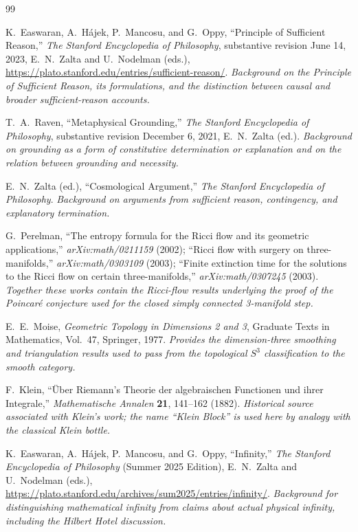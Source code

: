 \documentclass[11pt]{article}
\theoremstyle{canonstyle}
\newcommand{\CanonBibliographySetup}{%
  \small
  \setlength{\parskip}{0.22em}
  \setlength{\itemsep}{0.55em}
}
\begin{document}
\begin{thebibliography}{99}
\CanonBibliographySetup

K.~Easwaran, A.~H\'ajek, P.~Mancosu, and G.~Oppy, ``Principle of Sufficient Reason,'' \textit{The Stanford Encyclopedia of Philosophy}, substantive revision June 14, 2023, E.~N.~Zalta and U.~Nodelman (eds.), \url{https://plato.stanford.edu/entries/sufficient-reason/}.
\textit{Background on the Principle of Sufficient Reason, its formulations, and the distinction between causal and broader sufficient-reason accounts.}

T.~A.~Raven, ``Metaphysical Grounding,'' \textit{The Stanford Encyclopedia of Philosophy}, substantive revision December 6, 2021, E.~N.~Zalta (ed.).
\textit{Background on grounding as a form of constitutive determination or explanation and on the relation between grounding and necessity.}

E.~N.~Zalta (ed.), ``Cosmological Argument,'' \textit{The Stanford Encyclopedia of Philosophy}.
\textit{Background on arguments from sufficient reason, contingency, and explanatory termination.}

G.~Perelman, ``The entropy formula for the Ricci flow and its geometric applications,'' \textit{arXiv:math/0211159} (2002); ``Ricci flow with surgery on three-manifolds,'' \textit{arXiv:math/0303109} (2003); ``Finite extinction time for the solutions to the Ricci flow on certain three-manifolds,'' \textit{arXiv:math/0307245} (2003).
\textit{Together these works contain the Ricci-flow results underlying the proof of the Poincar\'e conjecture used for the closed simply connected 3-manifold step.}

E.~E.~Moise, \textit{Geometric Topology in Dimensions 2 and 3}, Graduate Texts in Mathematics, Vol.~47, Springer, 1977.
\textit{Provides the dimension-three smoothing and triangulation results used to pass from the topological $S^3$ classification to the smooth category.}

F.~Klein, ``\"Uber Riemann's Theorie der algebraischen Functionen und ihrer Integrale,'' \textit{Mathematische Annalen} \textbf{21}, 141--162 (1882).
\textit{Historical source associated with Klein's work; the name ``Klein Block'' is used here by analogy with the classical Klein bottle.}

K.~Easwaran, A.~H\'ajek, P.~Mancosu, and G.~Oppy, ``Infinity,'' \textit{The Stanford Encyclopedia of Philosophy} (Summer 2025 Edition), E.~N.~Zalta and U.~Nodelman (eds.), \url{https://plato.stanford.edu/archives/sum2025/entries/infinity/}.
\textit{Background for distinguishing mathematical infinity from claims about actual physical infinity, including the Hilbert Hotel discussion.}


\end{thebibliography}
\end{document}
